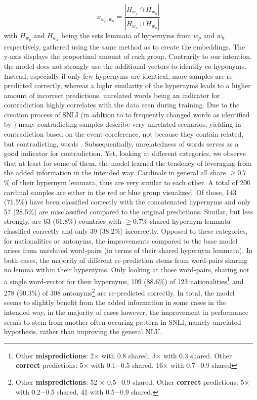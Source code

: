 \begin{equation}
x_{w_p,w_h} = \frac{|H_{w_p} \cap H_{w_h}|}{|H_{w_p} \cup H_{w_h}|}
\end{equation}
with $H_{w_p}$ and $H_{w_h}$ being the sets lemmata of hypernyms from $w_p$ and $w_h$ respectively, gathered using the same method as to create the embeddings. The y-axis displays the proportinal amount of each group. Contrarily to our intention, the model does not strongly use the additional vectors to identify co-hyponyms. Instead, especially if only few hypernyms are identical, more samples are re-predicted correctly, whereas a highr similarity of the hypernyms leads to a higher amount of incorrect predictions. unrelated words being an indicator for contradiction highly correlates with the data seen during training. Due to the creation process of \ac{SNLI} (in addtion to to frequently changed words as identified by \cite{gururangan2018annotation}) many contradicting samples describe very unrelated scenarios, yielding in contradiction based on the event-coreference, not because they contain related, but contradicting, words \citep{dasgupta2018evaluating}. Subsequentially, unrelatedness of words serves as a good indicator for contradiction. Yet, looking at different categories, we observe that at least for some of them, the model learned the tendency of leveraging from the added information in the intended way. Cardinals in general all share $\geq 0.7$ \% of their hypernym lemmata, thus are very similar to each other. A total of 200 cardinal samples are either in the red or blue group visualized. Of those, 143 (71.5\%) have been classified correctly with the concatenated hypernyms and only 57 (28.5\%) are misclassified compared to the original predictions. Similar, but less strongly, are 63 (61.8\%) countries with $\geq 0.7$\% shared hypernym lemmata classified correctly and only 39 (38.2\%) incorrectly. Opposed to these categories, for nationalities or antonyms, the improvements compared to the base model arises from unrelated word-pairs (in terms of their shared hypernym lemmata). In both cases, the majority of different re-prediction stems from word-pairs sharing no lemma within their hypernyms. Only looking at those word-pairs, sharing not a single word-vector for their hypernyms, 109 (88.6\%) of 123 nationalities\footnote{Other \textbf{mispredictions}: 2$\times$ with 0.8 shared, 3$\times$ with 0.3 shared. Other \textbf{correct} predictions: 5$\times$ with 0.1$-$0.5 shared, 16$\times$ with 0.7$-$0.9 shared} and 278 (90.3\%) of 308 antonyms\footnote{Other \textbf{mispredictions}: 52 $\times$ 0.5$-$0.9 shared. Other \textbf{correct} predictions: 5$\times$ with 0.2$-$0.5 shared, 41 with 0.5$-$0.9 shared.} are re-predicted correctly. In total, the model seems to slightly benefit from the added information in some cases in the intended way, in the majority of cases however, the improvement in performance seems to stem from another often occuring pattern in \ac{SNLI}, namely unrelated hypothesis, rather than improving the general \ac{NLU}. 

